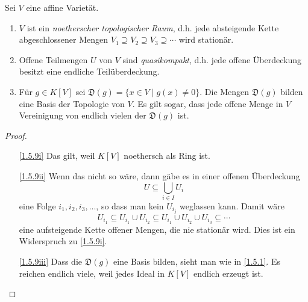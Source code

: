 \documentclass[a4paper,12pt,index=toc]{scrbook}
\theoremstyle{keinenummern} %
\newcommand{\D}{\mathfrak{D}}
\renewcommand{\dotsc}{\ensuremath{\!...}}
\begin{document}
\begin{bem}\label{1.5.9}
  Sei $V$ eine affine Varietät.
  \begin{enumerate}
  \item{} $V$ ist ein \emph{noetherscher topologischer Raum}, d.h. jede absteigende Kette abgeschlossener Mengen
    $V_1\supseteq V_2\supseteq V_3\supseteq\dotsm$ wird stationär.
  \item{} Offene Teilmengen $U$ von $V$ sind \emph{quasikompakt}, d.h. jede offene Überdeckung besitzt eine endliche
    Teilüberdeckung.
  \item{} Für $g\in K[V]$ sei $\D(g)=\{x\in V\mid g(x)\neq0\}$. Die Mengen $\D(g)$ bilden eine Basis der Topologie
    von $V$. Es gilt sogar, dass jede offene Menge in $V$ Vereinigung von endlich vielen der $\D(g)$ ist.
  \end{enumerate}
\end{bem}
\begin{proof}
  \begin{enumerate}
  \item[\ref{1.5.9i}] Das gilt, weil $K[V]$ noethersch als Ring ist.
  \item[\ref{1.5.9ii}] Wenn das nicht so wäre, dann gäbe es in einer offenen Überdeckung \begin{equation*}U\subseteq\bigcup_{i\in I}U_i\end{equation*} eine
    Folge $i_1,i_2,i_3,\dotsc$, so dass man kein $U_{i_j}$ weglassen kann. Damit wäre \begin{equation*}U_{i_1}\subseteq U_{i_1}\cup U_{i_2}
    \subseteq U_{i_1}\cup U_{i_2}\cup U_{i_3}\subseteq \dotsm\end{equation*} eine aufsteigende Kette offener Mengen, die nie stationär
    wird. Dies ist ein Widerspruch zu \ref{1.5.9i}.
  \item[\ref{1.5.9iii}] Dass die $\D(g)$ eine Basis bilden, sieht man wie in \cref{1.5.1}. Es reichen endlich viele, weil
    jedes Ideal in $K[V]$ endlich erzeugt ist.
  \end{enumerate}
\end{proof}

\end{document}
